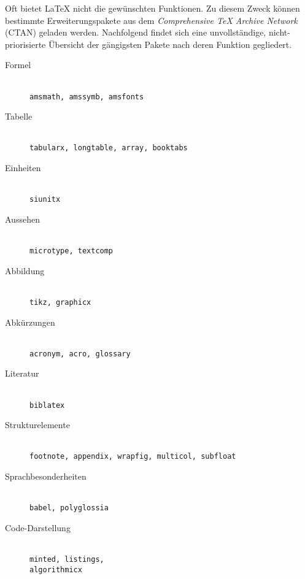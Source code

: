 Oft bietet \LaTeX{} nicht die gewünschten Funktionen.
Zu diesem Zweck können bestimmte Erweiterungspakete aus dem \emph{Comprehensive \TeX{} Archive Network} (CTAN) geladen werden.
%
Nachfolgend findet sich eine unvollständige, nicht-priorisierte Übersicht der gängigsten Pakete nach deren Funktion gegliedert.

\setlength{\columnsep}{3em}
\setlength{\columnseprule}{1pt}
\begin{multicols}{2}
\newcommand{\descFill}{\hfill\\}
\begin{description}
	\item[Formel] \descFill \texttt{amsmath, amssymb, amsfonts}
	\item[Tabelle] \descFill \texttt{tabularx, longtable, array, booktabs}
	\item[Einheiten] \descFill \texttt{siunitx}
	\item[Aussehen] \descFill \texttt{microtype, textcomp}
	\item[Abbildung] \descFill \texttt{tikz, graphicx}
\columnbreak
	\item[Abkürzungen] \descFill \texttt{acronym, acro, glossary}
	\item[Literatur] \descFill \texttt{biblatex}
	\item[Strukturelemente] \descFill \texttt{footnote, appendix, wrapfig, multicol, subfloat}
	\item[Sprachbesonderheiten] \descFill \texttt{babel, polyglossia}
	\item[Code-Darstellung] \descFill \texttt{minted, listings, \\ algorithmicx}
\end{description}
\end{multicols}
